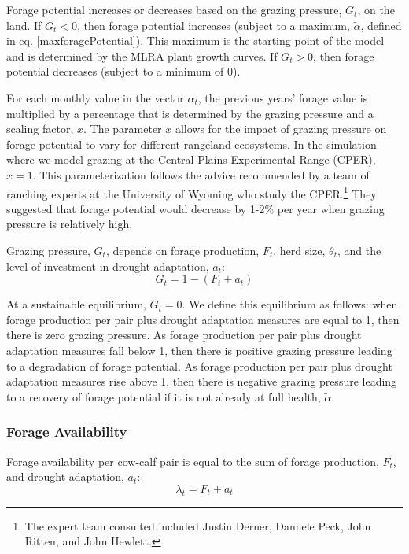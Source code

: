 \documentclass[11pt]{article}
\begin{document}
Forage potential increases or decreases based on the grazing pressure, $G_t$, on the land. If $G_t < 0$, then forage potential increases (subject to a maximum, $\tilde{\alpha}$, defined in eq. \ref{maxforagePotential}). This maximum is the starting point of the model and is determined by the MLRA plant growth curves.  If $G_t > 0$, then forage potential decreases (subject to a minimum of 0). 

For each monthly value in the vector $\alpha_{t}$, the previous years' forage value is multiplied by a percentage that is determined by the grazing pressure and a scaling factor, $x$. The parameter $x$ allows for the impact of grazing pressure on forage potential to vary for different rangeland ecosystems. In the simulation where we model grazing at the Central Plains Experimental Range (CPER), $x=1$. This parameterization follows the advice recommended by a team of ranching experts at the University of Wyoming who study the CPER.\footnote{The expert team consulted included Justin Derner, Dannele Peck, John Ritten, and John Hewlett.} They suggested that forage potential would decrease by 1-2\% per year when grazing pressure is relatively high. %

Grazing pressure, $G_t$, depends on forage production, $F_t$, herd size, $\theta_t$, and the level of investment in drought adaptation, $a_t$:
\begin{equation}
G_t = 1 - (F_t + a_t)
\end{equation}

At a sustainable equilibrium, $G_t = 0$. We define this equilibrium as follows: when forage production per pair plus drought adaptation measures are equal to 1, then there is zero grazing pressure. As forage production per pair plus drought adaptation measures fall below 1, then there is positive grazing pressure leading to a degradation of forage potential. As forage production per pair plus drought adaptation measures rise above 1, then there is negative grazing pressure leading to a recovery of forage potential if it is not already at full health, $\tilde{\alpha}$.  

\subsubsection{Forage Availability}
\label{forage}
Forage availability per cow-calf pair is equal to the sum of forage production, $F_t$, and drought adaptation, $a_t$:
\begin{equation}
\lambda_t = F_t + a_t
\end{equation}
\end{document}
